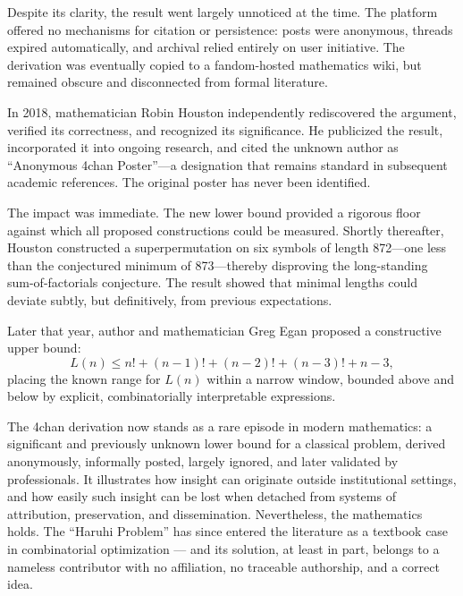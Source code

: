 Despite its clarity, the result went largely unnoticed at the time. The platform offered no mechanisms for citation or persistence: posts were anonymous, threads expired automatically, and archival relied entirely on user initiative. The derivation was eventually copied to a fandom-hosted mathematics wiki, but remained obscure and disconnected from formal literature.

In 2018, mathematician Robin Houston independently rediscovered the argument, verified its correctness, and recognized its significance. He publicized the result, incorporated it into ongoing research, and cited the unknown author as “Anonymous 4chan Poster”—a designation that remains standard in subsequent academic references. The original poster has never been identified.

The impact was immediate. The new lower bound provided a rigorous floor against which all proposed constructions could be measured. Shortly thereafter, Houston constructed a superpermutation on six symbols of length 872—one less than the conjectured minimum of 873—thereby disproving the long-standing sum-of-factorials conjecture. The result showed that minimal lengths could deviate subtly, but definitively, from previous expectations.

Later that year, author and mathematician Greg Egan proposed a constructive upper bound:
\[
L(n) \le n! + (n-1)! + (n-2)! + (n-3)! + n - 3,
\]
placing the known range for \(L(n)\) within a narrow window, bounded above and below by explicit, combinatorially interpretable expressions.

The 4chan derivation now stands as a rare episode in modern mathematics: a significant and previously unknown lower bound for a classical problem, derived anonymously, informally posted, largely ignored, and later validated by professionals. It illustrates how insight can originate outside institutional settings, and how easily such insight can be lost when detached from systems of attribution, preservation, and dissemination. Nevertheless, the mathematics holds. The “Haruhi Problem” has since entered the literature as a textbook case in combinatorial optimization — and its solution, at least in part, belongs to a nameless contributor with no affiliation, no traceable authorship, and a correct idea.
\clearpage
